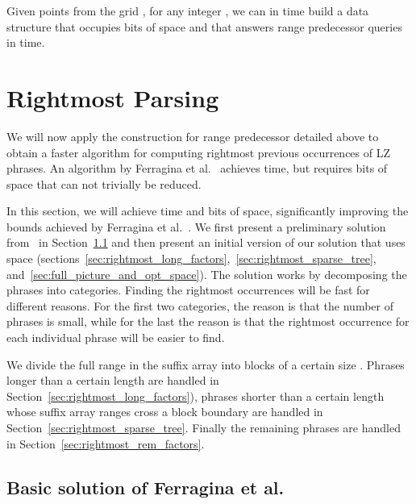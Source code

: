 \documentclass[11pt,runningheads]{llncs}
\begin{document}
{\begin{corollary}
\label{range_pred_corollary}
Given  points from the grid , for any integer , 
we can in  time build a data structure that occupies 
 bits of space and that answers 
range predecessor 
queries in  time. 

\end{corollary}


\section{Rightmost Parsing}
\label{sec-rightmost}

We will now apply the construction for range predecessor detailed above 
to obtain a faster algorithm for computing rightmost previous occurrences 
of LZ phrases. An algorithm by Ferragina et al.~\cite{fnv2013} achieves 
 time, but requires  bits 
of space that can not trivially be reduced.

In this section, we will achieve time 
and  bits of space, significantly improving the bounds 
achieved by Ferragina et al.~\cite{fnv2013}. We first present a preliminary 
solution from~\cite{fnv2013} in Section~\ref{sec:basic_rightmost} and then present an initial version of our 
solution that uses  space (sections~\ref{sec:rightmost_long_factors},~\ref{sec:rightmost_sparse_tree}, and~\ref{sec:full_picture_and_opt_space}). 
The solution works by decomposing the phrases into  categories. 
Finding the rightmost occurrences will be fast 
for different reasons. For the first two categories, the reason 
is that the number of phrases is small, while for the last the reason 
is that the rightmost occurrence for each individual phrase will be easier 
to find. 

We divide the full range  in the suffix array into blocks of a certain size . 
Phrases longer than 
a certain length   are handled in Section~\ref{sec:rightmost_long_factors}), phrases 
shorter than a certain length  whose suffix array ranges cross a block boundary
are handled in Section~\ref{sec:rightmost_sparse_tree}. Finally the remaining phrases are handled 
in Section~\ref{sec:rightmost_rem_factors}. 

\subsection{Basic solution of Ferragina et al.}
\label{sec:basic_rightmost}

}
\end{document}
